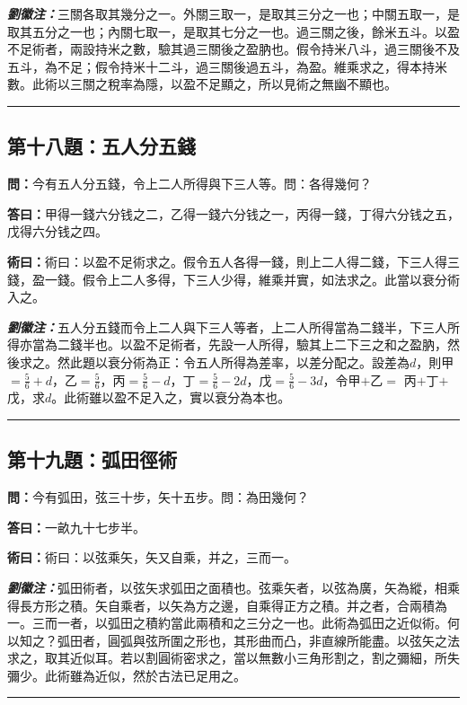 \documentclass[11pt,a4paper]{article}
\newcommand{\wen}[1]{\textbf{\color{problemcolor}問：}#1\par}
\newcommand{\da}[1]{\textbf{答曰：}#1\par}
\newcommand{\shu}[1]{\textbf{術曰：}#1\par}
\newcommand{\liuhui}[1]{{\color{commentarycolor}\textit{\textbf{劉徽注：}}#1\par}}
\begin{document}
\liuhui{三關各取其幾分之一。外關三取一，是取其三分之一也；中關五取一，是取其五分之一也；內關七取一，是取其七分之一也。過三關之後，餘米五斗。以盈不足術者，兩設持米之數，驗其過三關後之盈肭也。假令持米八斗，過三關後不及五斗，為不足；假令持米十二斗，過三關後過五斗，為盈。維乘求之，得本持米數。此術以三關之稅率為隱，以盈不足顯之，所以見術之無幽不顯也。}

\bigskip
\hrule
\bigskip

\subsection{第十八題：五人分五錢}

\wen{今有五人分五錢，令上二人所得與下三人等。問：各得幾何？}

\da{甲得一錢六分钱之二，乙得一錢六分钱之一，丙得一錢，丁得六分钱之五，戊得六分钱之四。}

\shu{術曰：以盈不足術求之。假令五人各得一錢，則上二人得二錢，下三人得三錢，盈一錢。假令上二人多得，下三人少得，維乘并實，如法求之。此當以衰分術入之。}

\liuhui{五人分五錢而令上二人與下三人等者，上二人所得當為二錢半，下三人所得亦當為二錢半也。以盈不足術者，先設一人所得，驗其上二下三之和之盈肭，然後求之。然此題以衰分術為正：令五人所得為差率，以差分配之。設差為$d$，則甲$= \frac{5}{6} + d$，乙$= \frac{5}{6}$，丙$= \frac{5}{6} - d$，丁$= \frac{5}{6} - 2d$，戊$= \frac{5}{6} - 3d$，令甲$+$乙$=$ 丙$+$丁$+$戊，求$d$。此術雖以盈不足入之，實以衰分為本也。}

\bigskip
\hrule
\bigskip

\subsection{第十九題：弧田徑術}

\wen{今有弧田，弦三十步，矢十五步。問：為田幾何？}

\da{一畝九十七步半。}

\shu{術曰：以弦乘矢，矢又自乘，并之，三而一。}

\liuhui{弧田術者，以弦矢求弧田之面積也。弦乘矢者，以弦為廣，矢為縱，相乘得長方形之積。矢自乘者，以矢為方之邊，自乘得正方之積。并之者，合兩積為一。三而一者，以弧田之積約當此兩積和之三分之一也。此術為弧田之近似術。何以知之？弧田者，圓弧與弦所圍之形也，其形曲而凸，非直線所能盡。以弦矢之法求之，取其近似耳。若以割圓術密求之，當以無數小三角形割之，割之彌細，所失彌少。此術雖為近似，然於古法已足用之。}

\bigskip
\hrule
\bigskip
\end{document}
